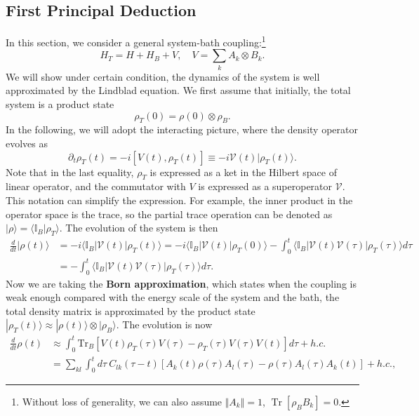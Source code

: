 \documentclass[aps,prx,superscriptaddress,nofootinbib]{revtex4}
\def \Tr{\operatorname{Tr}}
\begin{document}
\subsection{First Principal Deduction}
In this section, we consider a general system-bath coupling:\footnote{Without loss of generality, we can also assume $\Vert A_k \Vert =1$, $\Tr[\rho_B B_k]=0$.}
\begin{equation}
	H_T = H + H_B + V, \quad V = \sum_k A_k \otimes B_k.
\end{equation}
We will show under certain condition, the dynamics of the system is well approximated by the Lindblad equation. We first assume that initially, the total system is a product state 
$$\rho_T(0) = \rho(0) \otimes \rho_B.$$ 
In the following, we will adopt the interacting picture, where the density operator evolves as 
$$\partial_t \rho_T(t) = -i[V(t), \rho_T(t)] \equiv -i\mathcal V(t) |\rho_T(t) \rangle.$$
Note that in the last equality, $\rho_T$ is expressed as a ket in the Hilbert space of linear operator, and the commutator with $V$ is expressed as a superoperator $\mathcal V$. This notation can simplify the expression. For example, the inner product in the operator space is the trace, so the partial trace operation can be denoted as $|\rho\rangle = \langle \mathbb I_B|\rho_T\rangle$. The evolution of the system is then 
\begin{equation*}
\begin{aligned}
	\frac{d}{dt} |\rho(t)\rangle &= -i \langle \mathbb I_B|\mathcal V(t) |\rho_T(t)\rangle 
	= -i \langle \mathbb I_B|\mathcal{V}(t) |\rho_T(0)\rangle - \int_0^t \langle \mathbb I_B| \mathcal{V}(t) \mathcal{V}(\tau) |\rho_T(\tau)\rangle d\tau \\
	&= - \int_0^t \langle \mathbb I_B| \mathcal{V}(t) \mathcal{V}(\tau) |\rho_T(\tau)\rangle d\tau.
\end{aligned}
\end{equation*}
Now we are taking the \textbf{Born approximation}, which states when the coupling is weak enough compared with the energy scale of the system and the bath, the total density matrix is approximated by the product state $|\rho_T(t)\rangle \approx |\rho(t)\rangle \otimes |\rho_B\rangle$. The evolution is now
\begin{equation*}
\begin{aligned}
	\frac{d}{dt} \rho(t) &\approx \int_0^t \mathrm{Tr}_B\left[ V(t) \rho_T(\tau) V(\tau)- \rho_T(\tau) V(\tau) V(t) \right]d\tau +h.c. \\
	&= \sum_{kl}\int_0^t d\tau\ C_{lk}(\tau - t) \left[A_k(t)\rho(\tau)A_l(\tau)-\rho(\tau)A_l(\tau)A_k(t)\right]+h.c.,
\end{aligned}
\end{equation*}
\end{document}
